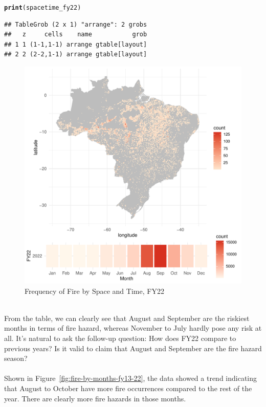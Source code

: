 \documentclass{article}\usepackage[]{graphicx}\usepackage[]{xcolor}
\makeatletter
\def\maxwidth{ %
  \ifdim\Gin@nat@width>\linewidth
    \linewidth
  \else
    \Gin@nat@width
  \fi
}
\newcommand{\hlstd}[1]{\textcolor[rgb]{0.345,0.345,0.345}{#1}}%
\newcommand{\hlkwd}[1]{\textcolor[rgb]{0.737,0.353,0.396}{\textbf{#1}}}%
\newenvironment{kframe}{%
 \def\at@end@of@kframe{}%
 \ifinner\ifhmode%
  \def\at@end@of@kframe{\end{minipage}}%
  \begin{minipage}{\columnwidth}%
 \fi\fi%
 \def\FrameCommand##1{\hskip\@totalleftmargin \hskip-\fboxsep
 \colorbox{shadecolor}{##1}\hskip-\fboxsep
     \hskip-\linewidth \hskip-\@totalleftmargin \hskip\columnwidth}%
 \MakeFramed {\advance\hsize-\width
   \@totalleftmargin\z@ \linewidth\hsize
   \@setminipage}}%
 {\par\unskip\endMakeFramed%
 \at@end@of@kframe}
\newenvironment{knitrout}{}{} %
\makeatother
\begin{document}
\begin{knitrout}
\begin{kframe}
\begin{alltt}
\hlkwd{print}\hlstd{(spacetime_fy22)}
\end{alltt}
\begin{verbatim}
## TableGrob (2 x 1) "arrange": 2 grobs
##   z     cells    name           grob
## 1 1 (1-1,1-1) arrange gtable[layout]
## 2 2 (2-2,1-1) arrange gtable[layout]
\end{verbatim}
\end{kframe}\begin{figure}
\includegraphics[width=\maxwidth]{figure/spacetime-fy22-1} \caption[Frequency of Fire by Space and Time, FY22]{Frequency of Fire by Space and Time, FY22}\label{fig:spacetime-fy22}
\end{figure}

\end{knitrout}
\\From the table, we can clearly see that August and September are the riskiest months in terms of fire hazard, whereas November to July hardly pose any risk at all. It's natural to ask the follow-up question: How does FY22 compare to previous years? Is it valid to claim that August and September are the fire hazard season?
\\    
\\Shown in Figure~\ref{fig:fire-by-months-fy13-22}, the data showed a trend indicating that August to October have more fire occurrences compared to the rest of the year. There are clearly more fire hazards in those months.
\\  
\end{document}
